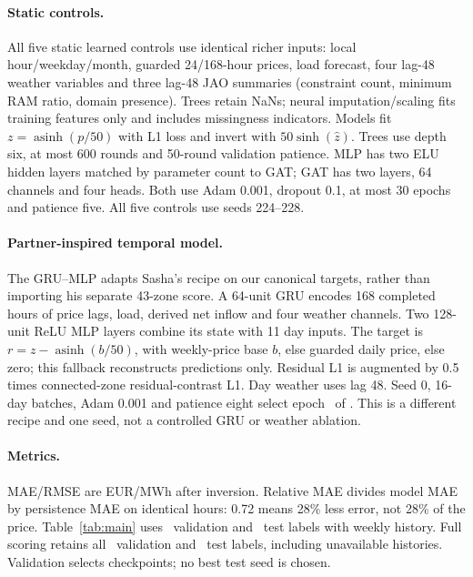 \documentclass{article}
\begin{document}
\paragraph{Static controls.}
All five static learned controls use identical richer inputs: local
hour/weekday/month, guarded 24/168-hour prices, load forecast, four lag-48 weather
variables and three lag-48 JAO summaries (constraint count, minimum RAM ratio,
domain presence). Trees retain NaNs; neural imputation/scaling fits training
features only and includes missingness indicators. Models fit
$z=\operatorname{asinh}(p/50)$ with L1 loss and invert with $50\sinh(\hat z)$.
Trees use depth six, at most 600 rounds and 50-round validation patience.
MLP has two ELU hidden layers matched by parameter count to GAT; GAT has two
layers, 64 channels and four heads. Both use Adam 0.001, dropout 0.1, at most
30 epochs and patience five. All five controls use seeds 224--228.

\paragraph{Partner-inspired temporal model.}
The GRU--MLP adapts Sasha's recipe on our canonical targets, rather than importing
his separate 43-zone score. A 64-unit GRU encodes 168 completed hours of price
lags, load, derived net inflow and four weather channels. Two 128-unit ReLU MLP
layers combine its state with 11 day inputs. The target is
$r=z-\operatorname{asinh}(b/50)$, with weekly-price base $b$, else guarded daily
price, else zero; this fallback reconstructs predictions only. Residual L1 is
augmented by 0.5 times connected-zone residual-contrast L1. Day weather uses
lag 48. Seed 0, 16-day batches, Adam 0.001 and patience eight select epoch
\GruBestEpoch\ of \GruEpochs. This is a different recipe and one seed,
not a controlled GRU or weather ablation.

\paragraph{Metrics.}
MAE/RMSE are EUR/MWh after inversion. Relative MAE divides model MAE by
persistence MAE on identical hours: 0.72 means 28\% less error, not 28\% of the
price. Table~\ref{tab:main} uses \ValPaired\ validation and \TestPaired\
test labels with weekly history. Full scoring retains all \ValAll\ validation
and \TestAll\ test labels, including unavailable histories. Validation selects
checkpoints; no best test seed is chosen.

\begin{table}[!ht]
\centering\small

\caption{Same 49-market cohort and matched hours. Static learned rows: five-seed
mean $\pm$ sample SD, not ensembles. $\dagger$: one verified seed, different
inputs/target/loss. Bold denotes the smallest reported mean, not significance
or a controlled GRU advantage. Lower is better.}
\label{tab:main}
\end{table}
\end{document}
